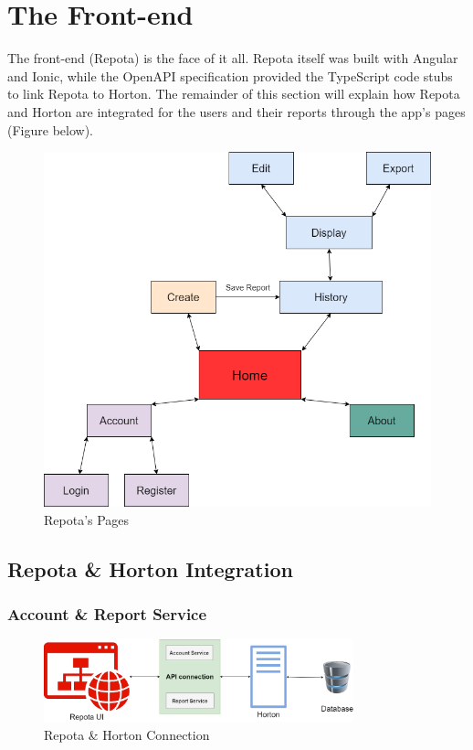 \section{The Front-end}
The front-end (Repota) is the face of it all. Repota itself was built with Angular and Ionic, while the OpenAPI specification provided the TypeScript code stubs to link Repota to Horton. The remainder of this section will explain how Repota and Horton are integrated for the users and their reports through the app's pages (Figure below).
\begin{figure}[H]
    \caption{Repota's Pages}
    \label{image:repotaPages}
    \centering
    \includegraphics[width=1.0\textwidth]{images/repota/pages_diagram.png}
\end{figure}
\newpage

\subsection{Repota \& Horton Integration}
\subsubsection{Account \& Report Service}
\begin{figure}[H]
    \caption{Repota \& Horton Connection}
    \label{image:repotaNhorton}
    \centering
    \includegraphics[width=0.8\textwidth]{images/repota_and_horton/repota_n_horton.png}
\end{figure}


